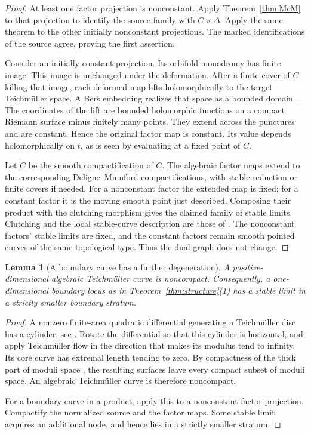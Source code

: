 \documentclass[11pt]{article}
\newcommand{\D}{\Delta}
\newcommand{\ol}[1]{\overline{#1}}
\newtheorem{lemma}[theorem]{Lemma}
\theoremstyle{remark}
\begin{document}
\begin{proof}
At least one factor projection is nonconstant. Apply
Theorem~\ref{thm:McM} to that projection to identify the source
family with \(C\times\D\). Apply the same theorem to the other
initially nonconstant projections. The marked identifications
of the source agree, proving the first assertion.

Consider an initially constant projection. Its orbifold
monodromy has finite image. This image is unchanged under the
deformation. After a finite cover of \(C\) killing that image,
each deformed map lifts holomorphically to the target
Teichm\"uller space. A Bers embedding realizes that space as
a bounded domain \cite{BersEmbedding}. The coordinates of the
lift are bounded holomorphic functions on a compact Riemann
surface minus finitely many points. They extend across the
punctures and are constant. Hence the original factor map is
constant. Its value depends holomorphically on \(t\), as is seen
by evaluating at a fixed point of \(C\).

Let \(\ol C\) be the smooth compactification of \(C\).
The algebraic factor maps extend to the corresponding
Deligne--Mumford compactifications, with stable reduction or
finite covers if needed. For a nonconstant factor the extended
map is fixed; for a constant factor it is the moving smooth
point just described. Composing their product with the
clutching morphism gives the claimed family of stable limits.
Clutching and the local stable-curve description are those of
\cite{DM}. The nonconstant factors' stable limits are fixed,
and the constant factors remain smooth pointed curves of the
same topological type. Thus the dual graph does not change.
\end{proof}

\begin{lemma}[A boundary curve has a further degeneration]
\label{lem:cusp}
A positive-dimensional algebraic Teichm\"uller curve is
noncompact. Consequently, a one-dimensional boundary locus as
in Theorem~\ref{thm:structure}(1) has a stable limit in a strictly
smaller boundary stratum.
\end{lemma}

\begin{proof}
A nonzero finite-area quadratic differential generating a
Teichm\"uller disc has a cylinder; see \cite{Masur}.
Rotate the differential so that this cylinder is horizontal,
and apply Teichm\"uller flow in the direction that makes its
modulus tend to infinity. Its core curve has extremal length
tending to zero. By compactness of the thick part of moduli
space \cite{Mumford}, the resulting surfaces leave every compact
subset of moduli space. An algebraic Teichm\"uller curve is
therefore noncompact.

For a boundary curve in a product, apply this to a nonconstant
factor projection. Compactify the normalized source and the
factor maps. Some stable limit acquires an additional node,
and hence lies in a strictly smaller stratum.
\end{proof}
\end{document}
